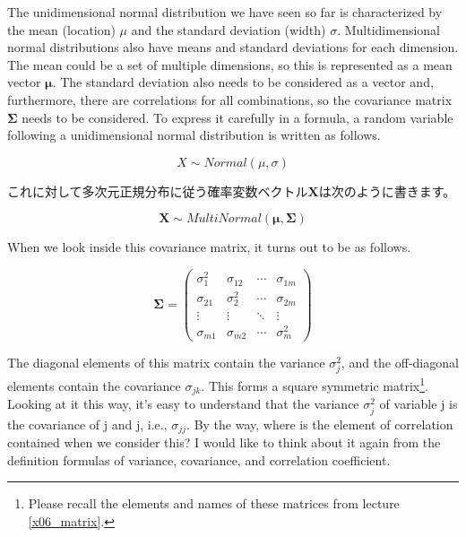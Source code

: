 \documentclass{ltjsbook}
\begin{document}
The unidimensional normal distribution we have seen so far is characterized by the mean (location) $\mu$ and the standard deviation (width) $\sigma$. Multidimensional normal distributions also have means and standard deviations for each dimension. The mean could be a set of multiple dimensions, so this is represented as a mean vector $\bm{\mu}$. The standard deviation also needs to be considered as a vector and, furthermore, there are correlations for all combinations, so the covariance matrix $\bm{\Sigma}$ needs to be considered. To express it carefully in a formula, a random variable following a unidimensional normal distribution is written as follows.

\[ X \sim Normal(\mu, \sigma) \]

これに対して多次元正規分布に従う確率変数ベクトル$\bm{X}$は次のように書きます。

\[ \bm{X} \sim MultiNormal(\bm{\mu}, \bm{\Sigma}) \]

When we look inside this covariance matrix, it turns out to be as follows.

\[ \bm{\Sigma} = \begin{pmatrix} \sigma_{1}^2 & \sigma_{12} & \cdots & \sigma_{1m}  \\
                \sigma_{21}  & \sigma_2^2  & \cdots & \sigma_{2m}  \\
                \vdots       & \vdots      & \ddots & \vdots       \\
                \sigma_{m1}  & \sigma_{m2} & \cdots & \sigma_{m}^2\end{pmatrix} \]

The diagonal elements of this matrix contain the variance $\sigma_j^2$, and the off-diagonal elements contain the covariance $\sigma_{jk}$. This forms a square symmetric matrix\footnote{Please recall the elements and names of these matrices from lecture \ref{x06_matrix}.}. Looking at it this way, it's easy to understand that the variance $\sigma_j^2$ of variable j is the covariance of j and j, i.e., $\sigma_{jj}$. By the way, where is the element of correlation contained when we consider this? I would like to think about it again from the definition formulas of variance, covariance, and correlation coefficient.
\end{document}
